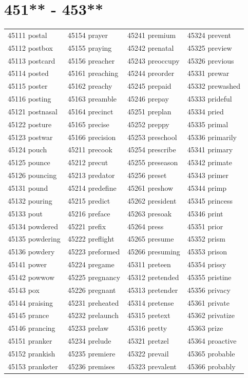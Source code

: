 \documentclass[10pt, oneside]{book}
\begin{document}
\begin{table}
	\centering
	\section*{451** - 453**}
	\begin{tabular}{l l l l}
45111 postal &45154 prayer &45241 premium &45324 prevent\\
45112 postbox &45155 praying &45242 prenatal &45325 preview\\
45113 postcard &45156 preacher &45243 preoccupy &45326 previous\\
45114 posted &45161 preaching &45244 preorder &45331 prewar\\
45115 poster &45162 preachy &45245 prepaid &45332 prewashed\\
45116 posting &45163 preamble &45246 prepay &45333 prideful\\
45121 postnasal &45164 precinct &45251 preplan &45334 pried\\
45122 posture &45165 precise &45252 preppy &45335 primal\\
45123 postwar &45166 precision &45253 preschool &45336 primarily\\
45124 pouch &45211 precook &45254 prescribe &45341 primary\\
45125 pounce &45212 precut &45255 preseason &45342 primate\\
45126 pouncing &45213 predator &45256 preset &45343 primer\\
45131 pound &45214 predefine &45261 preshow &45344 primp\\
45132 pouring &45215 predict &45262 president &45345 princess\\
45133 pout &45216 preface &45263 presoak &45346 print\\
45134 powdered &45221 prefix &45264 press &45351 prior\\
45135 powdering &45222 preflight &45265 presume &45352 prism\\
45136 powdery &45223 preformed &45266 presuming &45353 prison\\
45141 power &45224 pregame &45311 preteen &45354 prissy\\
45142 powwow &45225 pregnancy &45312 pretended &45355 pristine\\
45143 pox &45226 pregnant &45313 pretender &45356 privacy\\
45144 praising &45231 preheated &45314 pretense &45361 private\\
45145 prance &45232 prelaunch &45315 pretext &45362 privatize\\
45146 prancing &45233 prelaw &45316 pretty &45363 prize\\
45151 pranker &45234 prelude &45321 pretzel &45364 proactive\\
45152 prankish &45235 premiere &45322 prevail &45365 probable\\
45153 prankster &45236 premises &45323 prevalent &45366 probably\\
	\end{tabular}
 \end{table}
\clearpage
\end{document}
